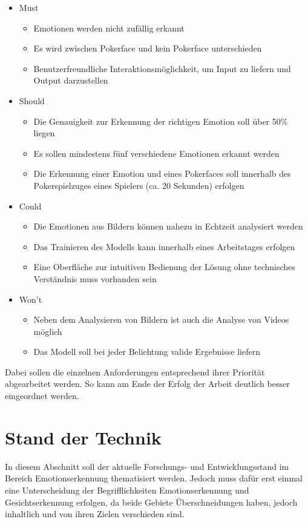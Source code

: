 \documentclass[12pt, a4paper]{report}
\begin{document}
\begin{itemize}
\item Must
\begin{itemize}
\item Emotionen werden nicht zufällig erkannt
\item Es wird zwischen Pokerface und kein Pokerface unterschieden
\item Benutzerfreundliche Interaktionsmöglichkeit, um Input zu liefern und Output darzustellen
\end{itemize}
\item Should
\begin{itemize}
\item Die Genauigkeit zur Erkennung der richtigen Emotion soll über 50\% liegen
\item Es sollen mindestens fünf verschiedene Emotionen erkannt werden
\item Die Erkennung einer Emotion und eines Pokerfaces soll innerhalb des Pokerspielzuges eines Spielers (ca. 20 Sekunden) erfolgen
\end{itemize}
\item Could
\begin{itemize}
\item Die Emotionen aus Bildern können nahezu in Echtzeit analysiert werden
\item Das Trainieren des Modells kann innerhalb eines Arbeitstages erfolgen
\item Eine Oberfläche zur intuitiven Bedienung der Lösung ohne technisches Verständnis muss vorhanden sein
\end{itemize}
\item Won't
\begin{itemize}
\item Neben dem Analysieren von Bildern ist auch die Analyse von Videos möglich
\item Das Modell soll bei jeder Belichtung valide Ergebnisse liefern
\end{itemize}
\end{itemize}
Dabei sollen die einzelnen Anforderungen entsprechend ihrer Priorität abgearbeitet werden. So kann am Ende der Erfolg der Arbeit deutlich besser eingeordnet werden.

\let\cleardoublepage\relax

\chapter{Stand der Technik}
In diesem Abschnitt soll der aktuelle Forschungs- und Entwicklungsstand im Bereich Emotionserkennung thematisiert werden. Jedoch muss dafür erst einmal eine Unterscheidung der Begrifflichkeiten Emotionserkennung und Gesichtserkennung erfolgen, da beide Gebiete Überschneidungen haben, jedoch inhaltlich und von ihren Zielen verschieden sind.
\end{document}
